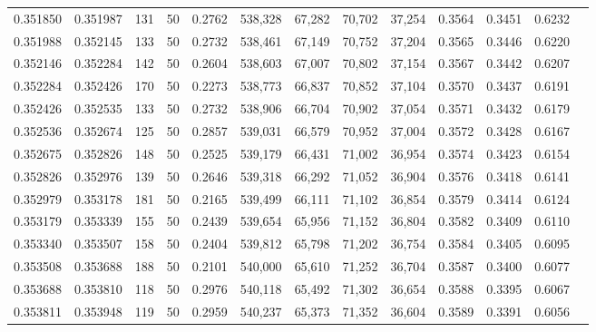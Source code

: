 \begin{tabular}{rrrrrrrrrrrrr}
0.351850 & 0.351987 &   131 &  50 &                                     0.2762 & 538,328 &  67,282 &  70,702 &  37,254 & 0.3564 & 0.3451 & 0.6232 \\
0.351988 & 0.352145 &   133 &  50 &                                     0.2732 & 538,461 &  67,149 &  70,752 &  37,204 & 0.3565 & 0.3446 & 0.6220 \\
0.352146 & 0.352284 &   142 &  50 &                                     0.2604 & 538,603 &  67,007 &  70,802 &  37,154 & 0.3567 & 0.3442 & 0.6207 \\
0.352284 & 0.352426 &   170 &  50 &                                     0.2273 & 538,773 &  66,837 &  70,852 &  37,104 & 0.3570 & 0.3437 & 0.6191 \\
0.352426 & 0.352535 &   133 &  50 &                                     0.2732 & 538,906 &  66,704 &  70,902 &  37,054 & 0.3571 & 0.3432 & 0.6179 \\
0.352536 & 0.352674 &   125 &  50 &                                     0.2857 & 539,031 &  66,579 &  70,952 &  37,004 & 0.3572 & 0.3428 & 0.6167 \\
0.352675 & 0.352826 &   148 &  50 &                                     0.2525 & 539,179 &  66,431 &  71,002 &  36,954 & 0.3574 & 0.3423 & 0.6154 \\
0.352826 & 0.352976 &   139 &  50 &                                     0.2646 & 539,318 &  66,292 &  71,052 &  36,904 & 0.3576 & 0.3418 & 0.6141 \\
0.352979 & 0.353178 &   181 &  50 &                                     0.2165 & 539,499 &  66,111 &  71,102 &  36,854 & 0.3579 & 0.3414 & 0.6124 \\
0.353179 & 0.353339 &   155 &  50 &                                     0.2439 & 539,654 &  65,956 &  71,152 &  36,804 & 0.3582 & 0.3409 & 0.6110 \\
0.353340 & 0.353507 &   158 &  50 &                                     0.2404 & 539,812 &  65,798 &  71,202 &  36,754 & 0.3584 & 0.3405 & 0.6095 \\
0.353508 & 0.353688 &   188 &  50 &                                     0.2101 & 540,000 &  65,610 &  71,252 &  36,704 & 0.3587 & 0.3400 & 0.6077 \\
0.353688 & 0.353810 &   118 &  50 &                                     0.2976 & 540,118 &  65,492 &  71,302 &  36,654 & 0.3588 & 0.3395 & 0.6067 \\
0.353811 & 0.353948 &   119 &  50 &                                     0.2959 & 540,237 &  65,373 &  71,352 &  36,604 & 0.3589 & 0.3391 & 0.6056 \\

\end{tabular}
